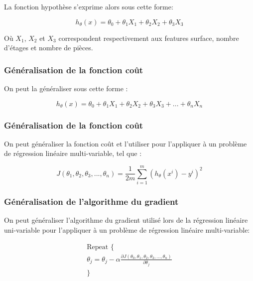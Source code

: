 La fonction hypothèse s'exprime alors sous cette forme: 

\begin{equation}
	h_\theta(x) = \theta_0 + \theta_1X_1 + \theta_2X_2 + \theta_3X_3
\end{equation}

Où $X_1$, $X_2$ et $X_3$ correspondent respectivement aux features surface, nombre d'étages et nombre de pièces.

\subsubsection{Généralisation de la fonction coût}
\label{Le Machine Learning:Les différents algorithmes d'apprentissage supervisé: La regression linéaire multi-variable: Généralisation de l'hypothèse}
On peut la généraliser sous cette forme : 

\begin{equation}
h_\theta(x) = \theta_0 + \theta_1X_1 + \theta_2X_2 + \theta_3X_3 + ... + \theta_nX_n
\label{hypotesis multivar}
\end{equation}


\subsubsection{Généralisation de la fonction coût}
\label{Le Machine Learning:Les différents algorithmes d'apprentissage supervisé: La regression linéaire multi-variable: Généralisation de la fonction coût}
On peut généraliser la fonction coût et l'utiliser pour l'appliquer à un problème de régression linéaire multi-variable, tel que :

\begin{equation}
J(\theta_1,\theta_2,\theta_3,...,\theta_n) =  \frac{1}{2m}\sum_{i=1}^{m}(h_\theta(x^i)-y^{i})^2
\end{equation}


\subsubsection{Généralisation de l'algorithme du gradient}
\label{Le Machine Learning:Les différents algorithmes d'apprentissage supervisé: La regression linéaire multi-variable: Généralisation de l'algorithme du gradient}
On peut généraliser l'algorithme du gradient utilisé lors de la régression linéaire uni-variable pour l'appliquer à un problème de régression linéaire multi-variable:
 
\begin{equation}
\begin{split}
\text{Repeat \{} \\
\theta_j = \theta_j - \alpha \frac{\partial J(\theta_0, \theta_1, \theta_2, \theta_3, ... , \theta_n)}{\partial\theta_j} \\
\text{\}} \\
\end{split}
\end{equation}

